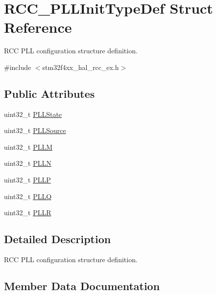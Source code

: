 \hypertarget{struct_r_c_c___p_l_l_init_type_def}{}\section{R\+C\+C\+\_\+\+P\+L\+L\+Init\+Type\+Def Struct Reference}
\label{struct_r_c_c___p_l_l_init_type_def}


R\+CC P\+LL configuration structure definition.  




{\ttfamily \#include $<$stm32f4xx\+\_\+hal\+\_\+rcc\+\_\+ex.\+h$>$}

\subsection*{Public Attributes}
\begin{DoxyCompactItemize}
\item 
uint32\+\_\+t \hyperlink{struct_r_c_c___p_l_l_init_type_def_a6cbaf84f6566af15e6e4f97a339d5759}{P\+L\+L\+State}
\item 
uint32\+\_\+t \hyperlink{struct_r_c_c___p_l_l_init_type_def_a72806832a179af8756b9330de7f7c6a8}{P\+L\+L\+Source}
\item 
uint32\+\_\+t \hyperlink{struct_r_c_c___p_l_l_init_type_def_af8ae37696b35fd358c1ec1f6391158a4}{P\+L\+LM}
\item 
uint32\+\_\+t \hyperlink{struct_r_c_c___p_l_l_init_type_def_a2482608639ebfffc51a41135c979369b}{P\+L\+LN}
\item 
uint32\+\_\+t \hyperlink{struct_r_c_c___p_l_l_init_type_def_a4ecedf3ef401fa564aa636824fc3ded0}{P\+L\+LP}
\item 
uint32\+\_\+t \hyperlink{struct_r_c_c___p_l_l_init_type_def_a2b69dfec4b8ab52d649a71d141892691}{P\+L\+LQ}
\item 
uint32\+\_\+t \hyperlink{struct_r_c_c___p_l_l_init_type_def_a41208d1f84fc268f14fed2c825d07fbc}{P\+L\+LR}
\end{DoxyCompactItemize}


\subsection{Detailed Description}
R\+CC P\+LL configuration structure definition. 

\subsection{Member Data Documentation}
